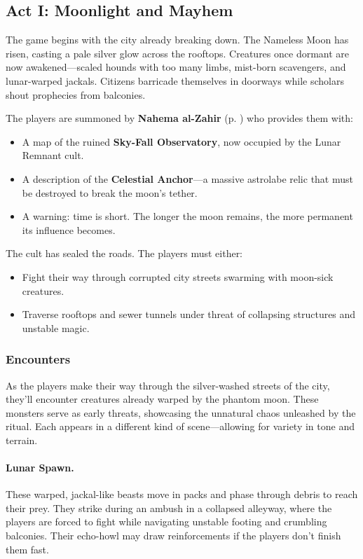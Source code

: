 
\subsection{Act I: Moonlight and Mayhem}

The game begins with the city already breaking down. The Nameless Moon has risen, casting a pale silver glow across the rooftops. Creatures once dormant are now awakened—scaled hounds with too many limbs, mist-born scavengers, and lunar-warped jackals. Citizens barricade themselves in doorways while scholars shout prophecies from balconies.

The players are summoned by \textbf{Nahema al-Zahir} (p. \pageref{npc:nahema-al-zahir}) who provides them with:

\begin{itemize}
  \item A map of the ruined \textbf{Sky-Fall Observatory}, now occupied by the Lunar Remnant cult.
  \item A description of the \textbf{Celestial Anchor}—a massive astrolabe relic that must be destroyed to break the moon's tether.
  \item A warning: time is short. The longer the moon remains, the more permanent its influence becomes.
\end{itemize}

The cult has sealed the roads. The players must either:

\begin{itemize}
  \item Fight their way through corrupted city streets swarming with moon-sick creatures.
  \item Traverse rooftops and sewer tunnels under threat of collapsing structures and unstable magic.
\end{itemize}

\subsubsection{Encounters}

As the players make their way through the silver-washed streets of the city, they’ll encounter creatures already warped by the phantom moon. These monsters serve as early threats, showcasing the unnatural chaos unleashed by the ritual. Each appears in a different kind of scene—allowing for variety in tone and terrain.

\paragraph{Lunar Spawn.}
These warped, jackal-like beasts move in packs and phase through debris to reach their prey. They strike during an ambush in a collapsed alleyway, where the players are forced to fight while navigating unstable footing and crumbling balconies. Their echo-howl may draw reinforcements if the players don’t finish them fast.

